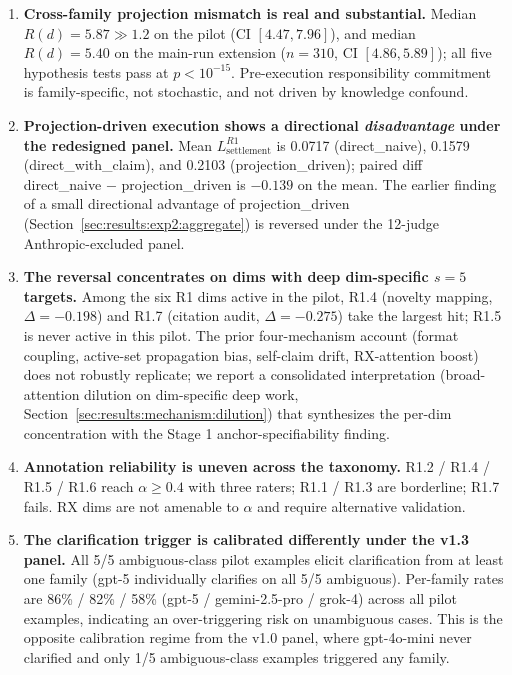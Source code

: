 \begin{enumerate}
    \item \textbf{Cross-family projection mismatch is real and substantial.} Median $R(d) = 5.87 \gg 1.2$ on the pilot (CI $[4.47, 7.96]$), and median $R(d) = 5.40$ on the main-run extension ($n = 310$, CI $[4.86, 5.89]$); all five hypothesis tests pass at $p < 10^{-15}$. Pre-execution responsibility commitment is family-specific, not stochastic, and not driven by knowledge confound.

    \item \textbf{Projection-driven execution shows a directional \emph{disadvantage} under the redesigned panel.} Mean $L_{\text{settlement}}^{R1}$ is 0.0717 (direct\_naive), 0.1579 (direct\_with\_claim), and 0.2103 (projection\_driven); paired diff direct\_naive $-$ projection\_driven is $-0.139$ on the mean. The earlier finding of a small directional advantage of projection\_driven (Section~\ref{sec:results:exp2:aggregate}) is reversed under the 12-judge Anthropic-excluded panel.

    \item \textbf{The reversal concentrates on dims with deep dim-specific $s = 5$ targets.} Among the six R1 dims active in the pilot, R1.4 (novelty mapping, $\Delta = -0.198$) and R1.7 (citation audit, $\Delta = -0.275$) take the largest hit; R1.5 is never active in this pilot. The prior four-mechanism account (format coupling, active-set propagation bias, self-claim drift, RX-attention boost) does not robustly replicate; we report a consolidated interpretation (broad-attention dilution on dim-specific deep work, Section~\ref{sec:results:mechanism:dilution}) that synthesizes the per-dim concentration with the Stage 1 anchor-specifiability finding.

    \item \textbf{Annotation reliability is uneven across the taxonomy.} R1.2 / R1.4 / R1.5 / R1.6 reach $\alpha \geq 0.4$ with three raters; R1.1 / R1.3 are borderline; R1.7 fails. RX dims are not amenable to $\alpha$ and require alternative validation.

    \item \textbf{The clarification trigger is calibrated differently under the v1.3 panel.} All 5/5 ambiguous-class pilot examples elicit clarification from at least one family (gpt-5 individually clarifies on all 5/5 ambiguous). Per-family rates are 86\% / 82\% / 58\% (gpt-5 / gemini-2.5-pro / grok-4) across all pilot examples, indicating an over-triggering risk on unambiguous cases. This is the opposite calibration regime from the v1.0 panel, where gpt-4o-mini never clarified and only 1/5 ambiguous-class examples triggered any family.


\end{enumerate}
